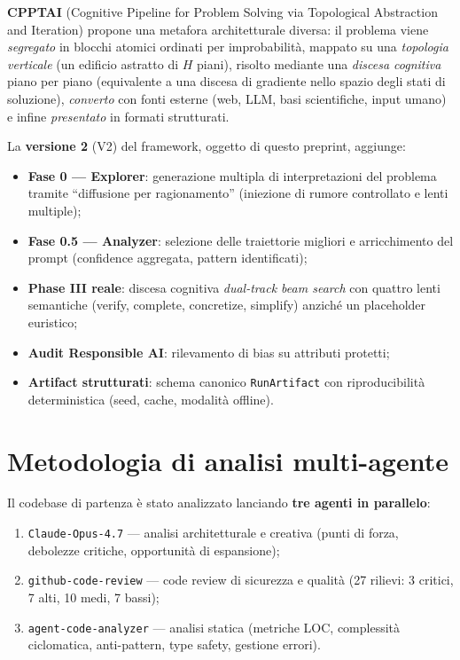 \documentclass[11pt,a4paper]{article}
\begin{document}
\textbf{CPPTAI} (Cognitive Pipeline for Problem Solving via Topological Abstraction
and Iteration) propone una metafora architetturale diversa: il problema viene
\emph{segregato} in blocchi atomici ordinati per improbabilità, mappato su una
\emph{topologia verticale} (un edificio astratto di $H$ piani), risolto mediante una
\emph{discesa cognitiva} piano per piano (equivalente a una discesa di gradiente nello
spazio degli stati di soluzione), \emph{converto} con fonti esterne (web, LLM, basi
scientifiche, input umano) e infine \emph{presentato} in formati strutturati.

La \textbf{versione 2} (V2) del framework, oggetto di questo preprint, aggiunge:
\begin{itemize}[leftmargin=1.2em]
  \item \textbf{Fase 0 — Explorer}: generazione multipla di interpretazioni del
        problema tramite ``diffusione per ragionamento'' (iniezione di rumore
        controllato e lenti multiple);
  \item \textbf{Fase 0.5 — Analyzer}: selezione delle traiettorie migliori e
        arricchimento del prompt (confidence aggregata, pattern identificati);
  \item \textbf{Phase III reale}: discesa cognitiva \emph{dual-track beam search}
        con quattro lenti semantiche (verify, complete, concretize, simplify)
        anziché un placeholder euristico;
  \item \textbf{Audit Responsible AI}: rilevamento di bias su attributi protetti;
  \item \textbf{Artifact strutturati}: schema canonico \texttt{RunArtifact} con
        riproducibilità deterministica (seed, cache, modalità offline).
\end{itemize}

\section{Metodologia di analisi multi-agente}
\label{sec:metodologia}

Il codebase di partenza è stato analizzato lanciando \textbf{tre agenti in parallelo}:
\begin{enumerate}[leftmargin=1.4em]
  \item \texttt{Claude-Opus-4.7} --- analisi architetturale e creativa (punti di
        forza, debolezze critiche, opportunità di espansione);
  \item \texttt{github-code-review} --- code review di sicurezza e qualità
        (27 rilievi: 3 critici, 7 alti, 10 medi, 7 bassi);
  \item \texttt{agent-code-analyzer} --- analisi statica (metriche LOC, complessità
        ciclomatica, anti-pattern, type safety, gestione errori).
\end{enumerate}
\end{document}

